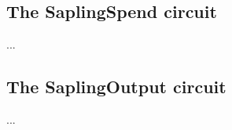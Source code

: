 \documentclass{article}
\newcommand{\introsection}{\needspace{35ex}}
\numberwithin{theorem}{subsection}
\begin{document}
{\introsection
\subsection{The SaplingSpend circuit} \label{cctsaplingspend}

\begin{formulae}
  \item ...
\end{formulae}


\introsection
\subsection{The SaplingOutput circuit} \label{cctsaplingoutput}

\begin{formulae}
  \item ...
\end{formulae}

} %
\end{document}
